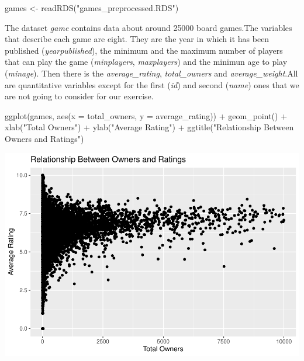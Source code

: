 \documentclass[
]{article}
\newenvironment{Shaded}{\begin{snugshade}}{\end{snugshade}}
\newcommand{\AttributeTok}[1]{\textcolor[rgb]{0.77,0.63,0.00}{#1}}
\newcommand{\FunctionTok}[1]{\textcolor[rgb]{0.00,0.00,0.00}{#1}}
\newcommand{\NormalTok}[1]{#1}
\newcommand{\OtherTok}[1]{\textcolor[rgb]{0.56,0.35,0.01}{#1}}
\newcommand{\SpecialCharTok}[1]{\textcolor[rgb]{0.00,0.00,0.00}{#1}}
\newcommand{\StringTok}[1]{\textcolor[rgb]{0.31,0.60,0.02}{#1}}
\begin{document}
\begin{Shaded}
\begin{Highlighting}[]
\NormalTok{games }\OtherTok{\textless{}{-}} \FunctionTok{readRDS}\NormalTok{(}\StringTok{"games\_preprocessed.RDS"}\NormalTok{)}
\end{Highlighting}
\end{Shaded}

The dataset \emph{game} contains data about around 25000 board games.The
variables that describe each game are eight. They are the year in which
it has been published (\emph{yearpublished}), the minimum and the
maximum number of players that can play the game (\emph{minplayers},
\emph{maxplayers}) and the minimun age to play (\emph{minage}). Then
there is the \emph{average\_rating}, \emph{total\_owners} and
\emph{average\_weight}.All are quantitative variables except for the
first (\emph{id}) and second (\emph{name}) ones that we are not going to
consider for our exercise.

\begin{Shaded}
\begin{Highlighting}[]
\FunctionTok{ggplot}\NormalTok{(games, }\FunctionTok{aes}\NormalTok{(}\AttributeTok{x =}\NormalTok{ total\_owners, }\AttributeTok{y =}\NormalTok{ average\_rating)) }\SpecialCharTok{+}
  \FunctionTok{geom\_point}\NormalTok{() }\SpecialCharTok{+}
  \FunctionTok{xlab}\NormalTok{(}\StringTok{"Total Owners"}\NormalTok{) }\SpecialCharTok{+}
  \FunctionTok{ylab}\NormalTok{(}\StringTok{"Average Rating"}\NormalTok{) }\SpecialCharTok{+}
  \FunctionTok{ggtitle}\NormalTok{(}\StringTok{"Relationship Between Owners and Ratings"}\NormalTok{)}
\end{Highlighting}
\end{Shaded}

\includegraphics{ANUASS2TEST_files/figure-latex/unnamed-chunk-3-1.pdf}
\end{document}
